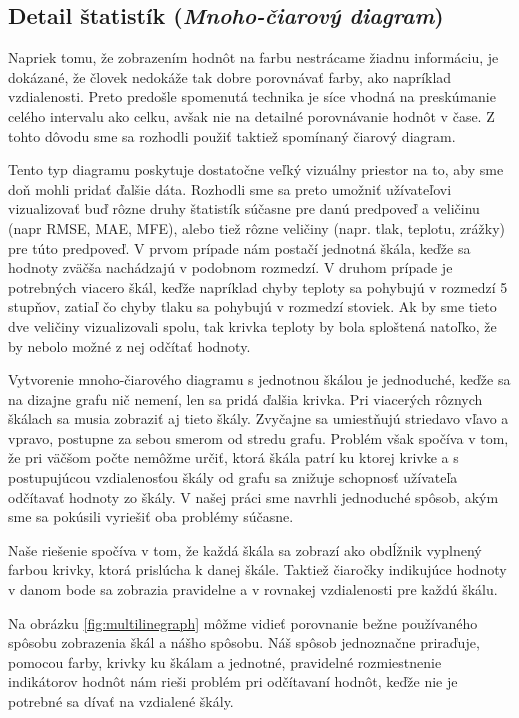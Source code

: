 \subsection{Detail štatistík {\small(\textit{Mnoho-čiarový diagram})}}
Napriek tomu, že zobrazením hodnôt na farbu nestrácame žiadnu informáciu, je dokázané, že človek nedokáže tak dobre porovnávať farby, ako napríklad vzdialenosti. Preto predošle spomenutá technika je síce vhodná na preskúmanie celého intervalu ako celku, avšak nie na detailné porovnávanie hodnôt v čase. Z tohto dôvodu sme sa rozhodli použiť taktiež spomínaný čiarový diagram. 

Tento typ diagramu poskytuje dostatočne veľký vizuálny priestor na to, aby sme doň mohli pridať ďalšie dáta. Rozhodli sme sa preto umožniť užívateľovi vizualizovať buď rôzne druhy štatistík súčasne pre danú predpoveď a veličinu (napr RMSE, MAE, MFE), alebo tiež rôzne veličiny (napr. tlak, teplotu, zrážky) pre túto predpoveď. V prvom prípade nám postačí jednotná škála, keďže sa hodnoty zväčša nachádzajú v podobnom rozmedzí. V druhom prípade je potrebných viacero škál, keďže napríklad chyby teploty sa pohybujú v rozmedzí 5 stupňov, zatiaľ čo chyby tlaku sa pohybujú v rozmedzí stoviek. Ak by sme tieto dve veličiny vizualizovali spolu, tak krivka teploty by bola sploštená natoľko, že by nebolo možné z nej odčítať hodnoty.

Vytvorenie mnoho-čiarového diagramu s jednotnou škálou je jednoduché, keďže sa na dizajne grafu nič nemení, len sa pridá ďalšia krivka. Pri viacerých rôznych škálach sa musia zobraziť aj tieto škály. Zvyčajne sa umiestňujú striedavo vľavo a vpravo, postupne za sebou smerom od stredu grafu. Problém však spočíva v tom, že pri väčšom počte nemôžme určiť, ktorá škála patrí ku ktorej krivke a s postupujúcou vzdialenosťou škály od grafu sa znižuje schopnosť užívateľa odčítavať hodnoty zo škály. V našej práci sme navrhli jednoduché spôsob, akým sme sa pokúsili vyriešiť oba problémy súčasne.

Naše riešenie spočíva v tom, že každá škála sa zobrazí ako obdĺžnik vyplnený farbou krivky, ktorá prislúcha k danej škále. Taktiež čiaročky indikujúce hodnoty v danom bode sa zobrazia pravidelne a v rovnakej vzdialenosti pre každú škálu.

Na obrázku \ref{fig:multilinegraph} môžme vidieť porovnanie bežne používaného spôsobu zobrazenia škál a nášho spôsobu. Náš spôsob jednoznačne priraďuje, pomocou farby, krivky ku škálam a jednotné, pravidelné rozmiestnenie indikátorov hodnôt nám rieši problém pri odčítavaní hodnôt, keďže nie je potrebné sa dívať na vzdialené škály.


